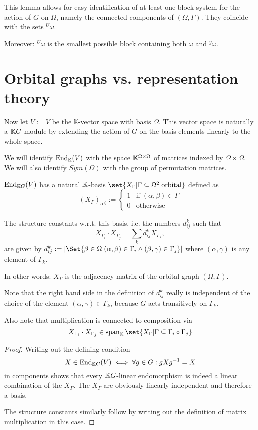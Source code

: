 \documentclass[fontsize=11pt,fleqn,a4paper]{scrartcl}
\begin{document}
\begin{remark}
This lemma allows for easy identification of at least one block system for the action of $G$ on $\Omega$, namely the connected components of $(\Omega,\Gamma)$. They coincide with the sets ${^U \omega}$.

Moreover: ${^U \omega}$ is the smallest possible block containing both $\omega$ and ${^y \omega}$.
\end{remark}

\section{Orbital graphs vs. representation theory}

\begin{definition}
Now let $V:=V$ be the $\mathbb{K}$-vector space with basis $\Omega$. This vector space is naturally a $\mathbb{K} G$-module by extending the action of $G$ on the basis elements linearly to the whole space.

We will identify $\operatorname{End}_{\mathbb{K}}(V)$ with the space $\mathbb{K}^{\Omega\times\Omega}$ of matrices indexed by $\Omega\times\Omega$. We will also identify $Sym(\Omega)$ with the group of permutation matrices.
\end{definition}

\begin{theorem}
$\operatorname{End}_{\mathbb{K} G}(V)$ has a natural $\mathbb{K}$-basis $\set{X_\Gamma | \Gamma\subseteq\Omega^2\;\text{orbital}}$ defined as
\[(X_\Gamma)_{\alpha\beta} := \begin{cases} 1 & \text{if}\;(\alpha,\beta)\in\Gamma \\ 0 & \text{otherwise}\end{cases}\]

The structure constants w.r.t. this basis, i.e. the numbers $d_{ij}^k$ such that
\[X_{\Gamma_i} \cdot X_{\Gamma_j} = \sum_{k} d_{ij}^k X_{\Gamma_k},\]
are given by $d_{ij}^k := \abs{\Set{\beta\in\Omega | (\alpha,\beta)\in\Gamma_i \wedge (\beta,\gamma) \in \Gamma_j}}$ where $(\alpha,\gamma)$ is any element of $\Gamma_k$.
\end{theorem}
\begin{remark}
In other words: $X_\Gamma$ is the adjacency matrix of the orbital graph $(\Omega,\Gamma)$.

Note that the right hand side in the definition of $d_{ij}^k$ really is independent of the choice of the element $(\alpha,\gamma)\in\Gamma_k$, because $G$ acts transitively on $\Gamma_k$.

Also note that multiplication is connected to composition via
\[X_{\Gamma_i} \cdot X_{\Gamma_j} \in \LinHull_\IK\set{X_\Gamma | \Gamma\subseteq \Gamma_i\circ\Gamma_j}\]
\end{remark}
\begin{proof}
Writing out the defining condition
\[X\in\operatorname{End}_{\mathbb{K} G}(V) \iff \forall g\in G: gXg^{-1} = X\]
in components shows that every $\mathbb{K} G$-linear endomorphism is indeed a linear combination of the $X_\Gamma$. The $X_\Gamma$ are obviously linearly independent and therefore a basis.

The structure constants similarly follow by writing out the definition of matrix multiplication in this case.
\end{proof}
\end{document}
